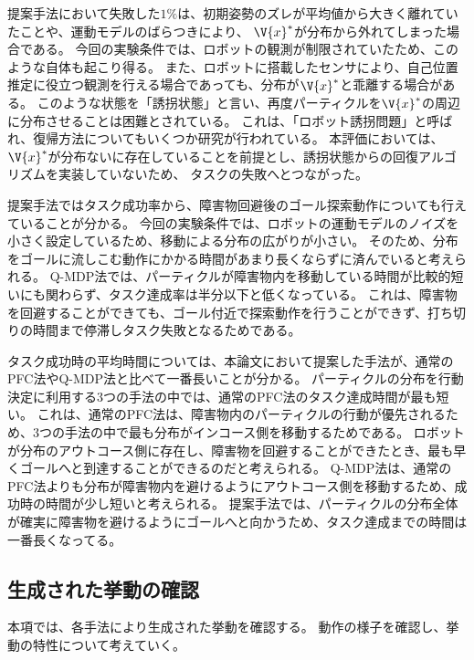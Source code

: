 提案手法において失敗した$1\%$は、初期姿勢のズレが平均値から大きく離れていたことや、運動モデルのばらつきにより、
$\V{x}^{*}$が分布から外れてしまった場合である。
今回の実験条件では、ロボットの観測が制限されていたため、このような自体も起こり得る。
また、ロボットに搭載したセンサにより、自己位置推定に役立つ観測を行える場合であっても、分布が$\V{x}^{*}$と乖離する場合がある。
このような状態を「誘拐状態」と言い、再度パーティクルを$\V{x}^{*}$の周辺に分布させることは困難とされている。
これは、「ロボット誘拐問題」と呼ばれ、復帰方法についてもいくつか研究が行われている\cite{lenser2000etal}。
本評価においては、$\V{x}^{*}$が分布ないに存在していることを前提とし、誘拐状態からの回復アルゴリズムを実装していないため、
タスクの失敗へとつながった。

提案手法ではタスク成功率から、障害物回避後のゴール探索動作についても行えていることが分かる。
今回の実験条件では、ロボットの運動モデルのノイズを小さく設定しているため、移動による分布の広がりが小さい。
そのため、分布をゴールに流しこむ動作にかかる時間があまり長くならずに済んでいると考えられる。
Q-MDP法では、パーティクルが障害物内を移動している時間が比較的短いにも関わらず、タスク達成率は半分以下と低くなっている。
これは、障害物を回避することができても、ゴール付近で探索動作を行うことができず、打ち切りの時間まで停滞しタスク失敗となるためである。

タスク成功時の平均時間については、本論文において提案した手法が、通常のPFC法やQ-MDP法と比べて一番長いことが分かる。
パーティクルの分布を行動決定に利用する3つの手法の中では、通常のPFC法のタスク達成時間が最も短い。
これは、通常のPFC法は、障害物内のパーティクルの行動が優先されるため、3つの手法の中で最も分布がインコース側を移動するためである。
ロボットが分布のアウトコース側に存在し、障害物を回避することができたとき、最も早くゴールへと到達することができるのだと考えられる。
Q-MDP法は、通常のPFC法よりも分布が障害物内を避けるようにアウトコース側を移動するため、成功時の時間が少し短いと考えられる。
提案手法では、パーティクルの分布全体が確実に障害物を避けるようにゴールへと向かうため、タスク達成までの時間は一番長くなってる。


\subsection{生成された挙動の確認}
本項では、各手法により生成された挙動を確認する。
動作の様子を確認し、挙動の特性について考えていく。


